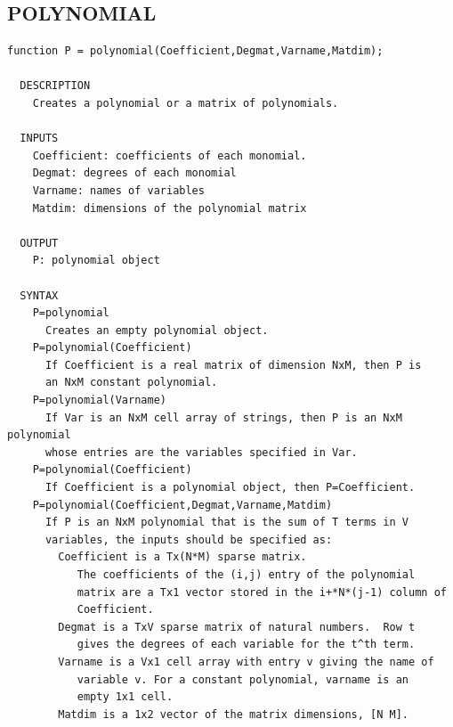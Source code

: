 \documentclass{article}
\begin{document}
\subsection{POLYNOMIAL}
\begin{verbatim}
function P = polynomial(Coefficient,Degmat,Varname,Matdim);

  DESCRIPTION
    Creates a polynomial or a matrix of polynomials.

  INPUTS
    Coefficient: coefficients of each monomial.
    Degmat: degrees of each monomial
    Varname: names of variables
    Matdim: dimensions of the polynomial matrix

  OUTPUT
    P: polynomial object

  SYNTAX
    P=polynomial
      Creates an empty polynomial object.
    P=polynomial(Coefficient)
      If Coefficient is a real matrix of dimension NxM, then P is
      an NxM constant polynomial.
    P=polynomial(Varname)
      If Var is an NxM cell array of strings, then P is an NxM polynomial
      whose entries are the variables specified in Var.
    P=polynomial(Coefficient)
      If Coefficient is a polynomial object, then P=Coefficient.
    P=polynomial(Coefficient,Degmat,Varname,Matdim)
      If P is an NxM polynomial that is the sum of T terms in V
      variables, the inputs should be specified as:
        Coefficient is a Tx(N*M) sparse matrix.
           The coefficients of the (i,j) entry of the polynomial
           matrix are a Tx1 vector stored in the i+*N*(j-1) column of
           Coefficient.
        Degmat is a TxV sparse matrix of natural numbers.  Row t
           gives the degrees of each variable for the t^th term.
        Varname is a Vx1 cell array with entry v giving the name of
           variable v. For a constant polynomial, varname is an
           empty 1x1 cell.
        Matdim is a 1x2 vector of the matrix dimensions, [N M].


\end{verbatim}

\newpage
\end{document}
